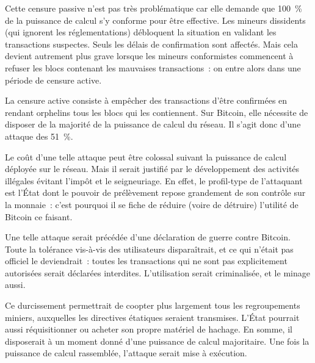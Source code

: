 Cette censure passive n'est pas très problématique car elle demande que 100~\% de la puissance de calcul s'y conforme pour être effective. Les mineurs dissidents (qui ignorent les réglementations) débloquent la situation en validant les transactions suspectes. Seuls les délais de confirmation sont affectés. Mais cela devient autrement plus grave lorsque les mineurs conformistes commencent à refuser les blocs contenant les mauvaises transactions~: on entre alors dans une période de censure active.

La censure active consiste à empêcher des transactions d'être confirmées en rendant orphelins tous les blocs qui les contiennent. Sur Bitcoin, elle nécessite de disposer de la majorité de la puissance de calcul du réseau. Il s'agit donc d'une attaque des 51~\%.

Le coût d'une telle attaque peut être colossal suivant la puissance de calcul déployée sur le réseau. Mais il serait justifié par le développement des activités illégales évitant l'impôt et le seigneuriage. En effet, le profil-type de l'attaquant est l'État dont le pouvoir de prélèvement repose grandement de son contrôle sur la monnaie~: c'est pourquoi il se fiche de réduire (voire de détruire) l'utilité de Bitcoin ce faisant.

Une telle attaque serait précédée d'une déclaration de guerre contre Bitcoin. Toute la tolérance vis-à-vis des utilisateurs disparaîtrait, et ce qui n'était pas officiel le deviendrait~: toutes les transactions qui ne sont pas explicitement autorisées serait déclarées interdites. L'utilisation serait criminalisée, et le minage aussi.


Ce durcissement permettrait de coopter plus largement tous les regroupements miniers, auxquelles les directives étatiques seraient transmises. L'État pourrait aussi réquisitionner ou acheter son propre matériel de hachage. En somme, il disposerait à un moment donné d'une puissance de calcul majoritaire. Une fois la puissance de calcul rassemblée, l'attaque serait mise à exécution.

